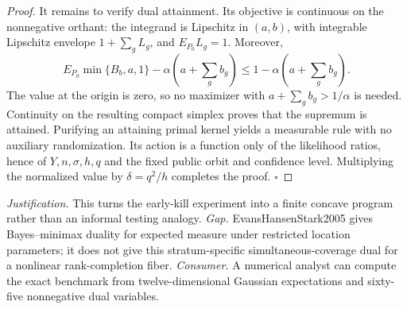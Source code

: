 \documentclass{article}
\begin{document}
\begin{proof}
It remains to verify dual attainment.  Its objective is continuous on the
nonnegative orthant: the integrand is Lipschitz in \((a,b)\), with integrable
Lipschitz envelope \(1+\sum_gL_g\), and \(E_{P_0}L_g=1\).  Moreover,
\[
E_{P_0}\min\{B_b,a,1\}-\alpha\!\left(a+\sum_gb_g\right)
\leq1-\alpha\!\left(a+\sum_gb_g\right).
\]
The value at the origin is zero, so no maximizer with
\(a+\sum_gb_g>1/\alpha\) is needed.  Continuity on the resulting compact
simplex proves that the supremum is attained.  Purifying an attaining primal
kernel yields a measurable rule with no auxiliary randomization.  Its action
is a function only of the likelihood ratios, hence of
\(Y,n,\sigma,h,q\) and the fixed public orbit and confidence level.  Multiplying
the normalized value by \(\delta=q^2/h\) completes the proof. \(\square\)
\end{proof}
\par\smallskip\noindent \textit{Justification.} This turns the early-kill experiment into a finite concave program rather than an informal testing analogy. \textit{Gap.} EvansHansenStark2005 gives Bayes--minimax duality for expected measure under restricted location parameters; it does not give this stratum-specific simultaneous-coverage dual for a nonlinear rank-completion fiber. \textit{Consumer.} A numerical analyst can compute the exact benchmark from twelve-dimensional Gaussian expectations and sixty-five nonnegative dual variables.
\end{document}
